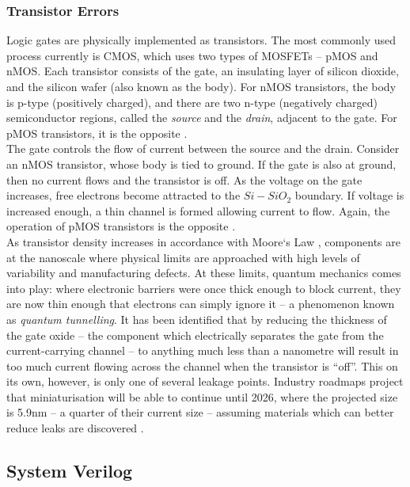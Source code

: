 \subsubsection{Transistor Errors}
\label{sec:rft-te}
\noindent Logic gates are physically implemented as transistors. The most commonly used process currently is CMOS, which uses two types 
of MOSFETs -- pMOS and nMOS. Each transistor consists of the gate, an insulating layer of silicon dioxide, and the silicon wafer (also 
known as the body). For nMOS transistors, the body is p-type (positively charged), and there are two n-type (negatively charged) 
semiconductor regions, called the \emph{source} and the \emph{drain}, adjacent to the gate. For pMOS transistors, it is the 
opposite \cite{vlsi}. \\

\noindent The gate controls the flow of current between the source and the drain. Consider an nMOS transistor, whose body is tied to 
ground. If the gate is also at ground, then no current flows and the transistor is off. As the voltage on the gate increases, free 
electrons become attracted to the $Si-SiO_2$ boundary. If voltage is increased enough, a thin channel is formed allowing current to flow. 
Again, the operation of pMOS transistors is the opposite \cite{vlsi}. \\

\noindent As transistor density increases in accordance with Moore`s Law \cite{moore}, components are at the nanoscale where physical 
limits are approached with high levels of variability and manufacturing defects. At these limits, quantum mechanics comes into play: where 
electronic barriers were once thick enough to block current, they are now thin enough that electrons can simply ignore it -- a phenomenon 
known as \emph{quantum tunnelling}. It has been identified that by reducing the thickness of the gate oxide -- the component which 
electrically separates the gate from the current-carrying channel -- to anything much less than a nanometre will result in too much 
current flowing across the channel when the transistor is ``off''. This on its own, however, is only one of several leakage points. 
Industry roadmaps project that miniaturisation will be able to continue until 2026, where the projected size is 5.9nm -- a quarter of 
their current size -- assuming materials which can better reduce leaks are discovered \cite{tunnel}.

\subsection{System Verilog}
\label{sec:bgrw-sv}

